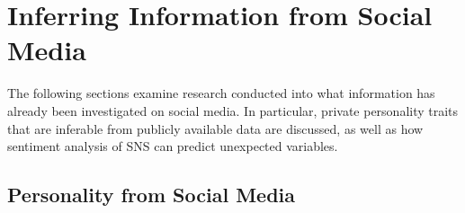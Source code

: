 \section{Inferring Information from Social Media}

The following sections examine research conducted into what information has already been investigated on social media. In particular, private personality traits that are inferable from publicly available data are discussed, as well as how sentiment analysis of SNS can predict unexpected variables. 



\subsection{Personality from Social Media}


